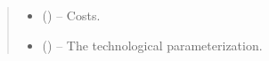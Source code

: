 \documentclass[letterpaper,10pt,english]{sphinxmanual}
\begin{document}
\begin{fulllineitems}
\begin{quote}
\begin{description}
\begin{itemize}
\item {} 
\sphinxAtStartPar
{} () – Costs.

\item {} 
\sphinxAtStartPar
{} () – The technological parameterization.

\end{itemize}

\end{description}\end{quote}

\end{fulllineitems}

\end{document}
